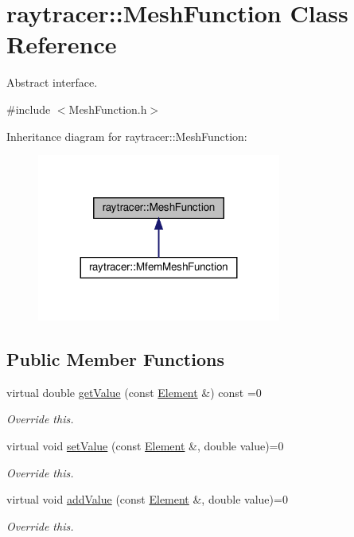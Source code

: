 \hypertarget{classraytracer_1_1MeshFunction}{}\section{raytracer\+:\+:Mesh\+Function Class Reference}
\label{classraytracer_1_1MeshFunction}


Abstract interface.  




{\ttfamily \#include $<$Mesh\+Function.\+h$>$}



Inheritance diagram for raytracer\+:\+:Mesh\+Function\+:
\nopagebreak
\begin{figure}[H]
\begin{center}
\leavevmode
\includegraphics[width=227pt]{classraytracer_1_1MeshFunction__inherit__graph}
\end{center}
\end{figure}
\subsection*{Public Member Functions}
\begin{DoxyCompactItemize}
\item 
virtual double \hyperlink{classraytracer_1_1MeshFunction_a49888c1924a473a1d98564a4732edd3a}{get\+Value} (const \hyperlink{classraytracer_1_1Element}{Element} \&) const =0
\begin{DoxyCompactList}\small\item\em Override this. \end{DoxyCompactList}\item 
virtual void \hyperlink{classraytracer_1_1MeshFunction_a0d71fc5b456edd7a89267a071ae6dd81}{set\+Value} (const \hyperlink{classraytracer_1_1Element}{Element} \&, double value)=0
\begin{DoxyCompactList}\small\item\em Override this. \end{DoxyCompactList}\item 
virtual void \hyperlink{classraytracer_1_1MeshFunction_a134b7ca4400d04030a67cadd691ee879}{add\+Value} (const \hyperlink{classraytracer_1_1Element}{Element} \&, double value)=0
\begin{DoxyCompactList}\small\item\em Override this. \end{DoxyCompactList}\end{DoxyCompactItemize}


